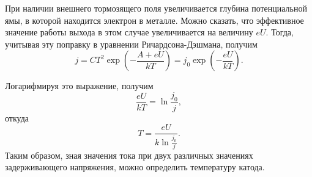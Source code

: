 
При наличии внешнего тормозящего поля увеличивается глубина потенциальной ямы, в
которой находится электрон в металле. Можно сказать, что эффективное значение
работы выхода в этом случае увеличивается на величину \( eU \). Тогда, учитывая
эту поправку в уравнении Ричардсона-Дэшмана, получим
\[
    j = CT^2\exp\left(-\frac{A+eU}{kT}\right) =
    j_0\exp\left(-\frac{eU}{kT}\right).
\]

Логарифмируя это выражение, получим
\[
    \frac{eU}{kT} = \ln\frac{j_0}{j},
\]
откуда
\[
    T = \frac{eU}{k\ln\frac{j_0}{j}}.
\]
Таким образом, зная значения тока при двух различных значениях задерживающего
напряжения, можно определить температуру катода.

